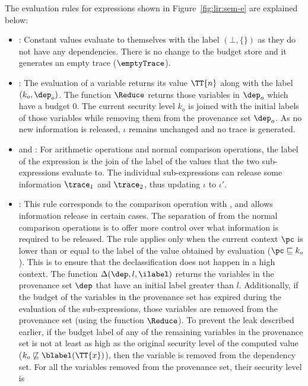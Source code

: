 The evaluation rules for expressions shown in Figure~\ref{fig:lir:sem-e}
are explained below:
\begin{itemize}
\item {}: Constant values evaluate to themselves with
  the label $(\bot, \{\})$ as they do not have any dependencies. There
  is no change to the budget store and it generates an empty trace ($\emptyTrace$).
\item {}: 
  The evaluation of a variable returns its value $\TT{n}$ along
  with the label $(k_o, \dep_o)$. The function $\Reduce$ returns those
  variables in $\dep_o$ which have a budget $0$. The current security
  level $k_o$ is joined with the initial labels of those variables
  while removing them from the provenance set $\dep_o$.  As no new
  information is released, $\iota$ remains unchanged and no trace is
  generated. 
\item {} and : For arithmetic
  operations and normal comparison operations, the label of the
  expression is the join of the label of the values that the two
  sub-expressions evaluate to. The individual sub-expressions can
  release some information $\trace_1$ and $\trace_2$, thus updating
  $\iota$ to $\iota'$.
\item {}: This rule corresponds to the comparison
  operation with \dec, and allows information release in certain
  cases. The separation of  from the normal comparison operations
  is to offer more control over what information is required to be
  released. The rule applies only when the current context $\pc$ is
  lower than or equal to the label of the value obtained by evaluation
  ($\pc \sqsubseteq k_o$). This is to ensure that the declassification
  does not happen 
  in a high context. The function $\Delta(\dep, l, \ilabel)$ returns
  the variables in the provenance set $\dep$ that have an initial
  label greater than $l$. Additionally, if the budget of the variables
  in the provenance set has expired during the evaluation of the
  sub-expressions, those variables are removed from the provenance set
  (using the function $\Reduce$). To prevent the leak described earlier,
  if the budget label of any of the remaining variables in the
  provenance set is not at least as high as the original security 
  level of the computed value ($k_o \not\sqsubseteq \blabel(\TT{x})$),
  then the variable is removed from the dependency set. For all the
  variables removed from the provenance set, their security level is

\end{itemize}

